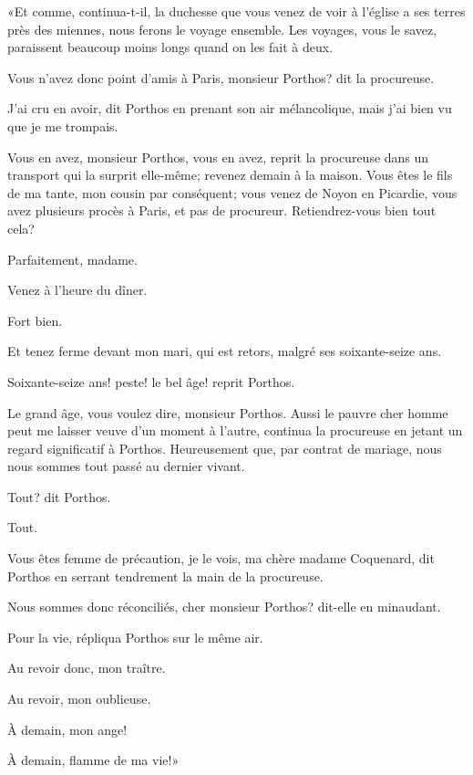 «Et comme, continua-t-il, la duchesse que vous venez de voir à l'église a ses terres près des miennes, nous ferons le voyage ensemble. Les voyages, vous le savez, paraissent beaucoup moins longs quand on les fait à deux. 

\speak  Vous n'avez donc point d'amis à Paris, monsieur Porthos? dit la procureuse. 

\speak  J'ai cru en avoir, dit Porthos en prenant son air mélancolique, mais j'ai bien vu que je me trompais. 

\speak  Vous en avez, monsieur Porthos, vous en avez, reprit la procureuse dans un transport qui la surprit elle-même; revenez demain à la maison. Vous êtes le fils de ma tante, mon cousin par conséquent; vous venez de Noyon en Picardie, vous avez plusieurs procès à Paris, et pas de procureur. Retiendrez-vous bien tout cela? 

\speak  Parfaitement, madame. 

\speak  Venez à l'heure du dîner. 

\speak  Fort bien. 

\speak  Et tenez ferme devant mon mari, qui est retors, malgré ses soixante-seize ans. 

\speak  Soixante-seize ans! peste! le bel âge! reprit Porthos. 

\speak  Le grand âge, vous voulez dire, monsieur Porthos. Aussi le pauvre cher homme peut me laisser veuve d'un moment à l'autre, continua la procureuse en jetant un regard significatif à Porthos. Heureusement que, par contrat de mariage, nous nous sommes tout passé au dernier vivant. 

\speak  Tout? dit Porthos. 

\speak  Tout. 

\speak  Vous êtes femme de précaution, je le vois, ma chère madame Coquenard, dit Porthos en serrant tendrement la main de la procureuse. 

\speak  Nous sommes donc réconciliés, cher monsieur Porthos? dit-elle en minaudant. 

\speak  Pour la vie, répliqua Porthos sur le même air. 

\speak  Au revoir donc, mon traître. 

\speak  Au revoir, mon oublieuse. 

\speak  À demain, mon ange! 

\speak  À demain, flamme de ma vie!» 